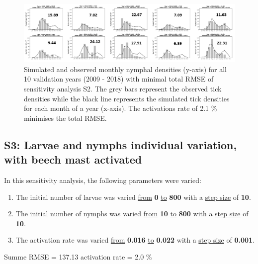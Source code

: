 \documentclass[a4paper, 11pt]{scrartcl}
\begin{document}
\begin{figure}[h!]
\centering
\includegraphics[width=\linewidth]{figures/initial_ticks_without_beech.png}
\caption{Simulated and observed monthly nymphal densities (y-axis) for all 10 validation years (2009 - 2018) with minimal total RMSE of sensitivity analysis S2. The grey bars
represent the observed tick densities while the black line represents the simulated tick densities for each month of a year (x-axis). The activations rate of 2.1 \% minimises
the total RMSE.}
\label{fig:initial_ticks_without_beech}
\end{figure}


\newpage
\subsection{S3: Larvae and nymphs individual variation, with beech mast activated}
In this sensitivity analysis, the following parameters were varied:

\begin{enumerate}
\item The initial number of larvae was varied \underline{from} \textbf{0} \underline{to} \textbf{800} with a \underline{step size} of \textbf{10}.
\item The initial number of nymphs was varied \underline{from} \textbf{10} \underline{to} \textbf{800} with a \underline{step size} of \textbf{10}.
\item The activation rate was varied \underline{from} \textbf{0.016} \underline{to} \textbf{0.022} with a \underline{step size} of \textbf{0.001}.
\end{enumerate}

Summe RMSE = 137.13
activation rate = 2.0 \%
\end{document}
